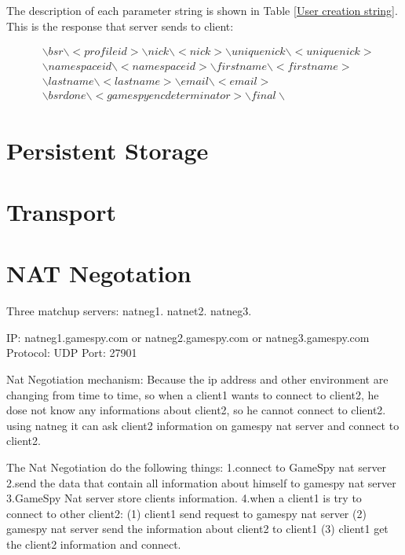 \documentclass[oneside,titlepage,a4paper]{Definition/retrospy} %
\begin{document}
The description of each parameter string is shown in Table \ref{User creation string}.
This is the response that server sends to client:
\begin{tcolorbox}
\begin{equation}
	\begin{split}
	&\backslash bsr \backslash <profileid> \backslash nick \backslash <nick>	\backslash uniquenick \backslash <uniquenick> \\
	&\backslash namespaceid \backslash <namespaceid>\backslash firstname \backslash <firstname> \\ 
	&\backslash lastname \backslash <lastname>\backslash email \backslash <email> \\
	&\backslash bsrdone \backslash <gamespy enc determinator> \backslash final \backslash
	\end{split}
\end{equation}
\end{tcolorbox}

\chapter{Persistent Storage}
\chapter{Transport}
\chapter{NAT Negotation}
Three matchup servers: natneg1. natnet2. natneg3.

IP: natneg1.gamespy.com or natneg2.gamespy.com or natneg3.gamespy.com
Protocol: UDP
Port: 27901

Nat Negotiation mechanism:
Because the ip address and other environment are changing from time to time, so when a client1 wants to connect
to client2, he dose not know any informations about client2, so he cannot connect to client2. using natneg it can ask client2 information on gamespy nat server and connect to client2.

The Nat Negotiation do the following things:
1.connect to GameSpy nat server
2.send the data that contain all information about himself to gamespy nat server
3.GameSpy Nat server store clients information.
4.when a client1 is try to connect to other client2:
(1) client1 send request to gamespy nat server
(2) gamespy nat server send the information about client2 to client1
(3) client1 get the client2 information and connect.
\end{document}
